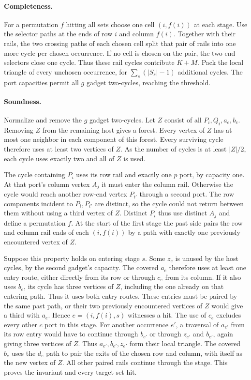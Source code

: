 \documentclass[11pt]{article}
\begin{document}
\paragraph{Completeness.}
For a permutation \(f\) hitting all sets choose one cell
\((i,f(i))\) at each stage. Use the selector paths at the ends
of row \(i\) and column \(f(i)\). Together with their rails,
the two crossing paths of each chosen cell split that pair of
rails into one more cycle per chosen occurrence. If no cell is
chosen on the pair, the two end selectors close one cycle.
Thus these rail cycles contribute \(K+M\). Pack the local
triangle of every unchosen occurrence, for \(\sum_s(|S_s|-1)\)
additional cycles. The port capacities permit all \(g\) gadget
two-cycles, reaching the threshold.

\paragraph{Soundness.}
Normalize and remove the \(g\) gadget two-cycles. Let \(Z\)
consist of all \(P_i,Q_i,a_e,b_e\). Removing \(Z\) from the remaining
host gives a forest. Every vertex of \(Z\) has at most one neighbor
in each component of this forest. Every surviving cycle therefore
uses at least two vertices of \(Z\). As the number of cycles is
at least \(|Z|/2\), each cycle uses exactly two and all of \(Z\)
is used.

The cycle containing \(P_i\) uses its row rail and exactly one
\(p\) port, by capacity one. At that port's column vertex \(A_j\)
it must enter the column rail. Otherwise the cycle would reach
another row-end vertex \(P_{i'}\) through a second port. The row
components incident to \(P_i,P_{i'}\) are distinct, so the cycle
could not return between them without using a third vertex of
\(Z\). Distinct \(P_i\) thus use distinct \(A_j\) and define a
permutation \(f\). At the start of the first stage the past side
pairs the row and column rail ends of each \((i,f(i))\) by a
path with exactly one previously encountered vertex of \(Z\).

Suppose this property holds on entering stage \(s\). Some \(z_e\)
is unused by the host cycles, by the second gadget's capacity.
The covered \(a_e\) therefore uses at least one entry route,
either directly from its row or through \(c_e\) from its column.
If it also uses \(b_e\), its cycle has three vertices of \(Z\),
including the one already on that entering path. Thus it uses
both entry routes. These entries must be paired by the
same past path, or their two previously encountered vertices
of \(Z\) would give a third with \(a_e\). Hence \(e=(i,f(i),s)\)
witnesses a hit. The use of \(c_e\) excludes every other \(c\)
port in this stage. For another occurrence \(e'\), a traversal
of \(a_{e'}\) from its row entry would have to continue through
\(b_{e'}\) or through \(z_{e'}\) and \(b_{e'}\), again giving three
vertices of \(Z\). Thus \(a_{e'},b_{e'},z_{e'}\) form their local
triangle. The covered \(b_e\) uses the \(d_e\) path to pair the
exits of the chosen row and column, with itself as the new
vertex of \(Z\). All other paired rails continue through the
stage. This proves the invariant and every target-set hit.
\end{document}
